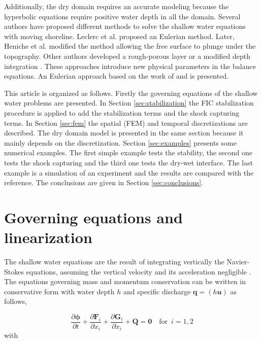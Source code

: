 \documentclass[a4paper,12pt]{elsarticle}
\newcommand{\pder}[2]{\frac{\partial#1}{\partial#2}}
\begin{document}
Additionally, the dry domain requires an accurate modeling because the hyperbolic equations require positive water depth in all the domain.
Several authors have proposed different methods to solve the shallow water equations with moving shoreline. Leclerc et al. \cite{leclerc1990} proposed an Eulerian method. Later, Heniche et al. \cite{heniche2000} modified the method allowing the free surface to plunge under the topography.
Other authors developed a rough-porous layer \cite{candy2017,barros2011} or a modified depth integration \cite{defina2000}. These approaches introduce new physical parameters in the balance equations.
An Eulerian approach based on the work of \cite{leclerc1990} and \cite{heniche2000} is presented.


This article is organized as follows. Firstly the governing equations of the shallow water problems are presented.
In Section \ref{sec:stabilization} the FIC stabilization procedure is applied to add the stabilization terms and the shock capturing terms.
In Section \ref{sec:fem} the spatial (FEM) and temporal discretizations are described.
The dry domain model is presented in the same section because it mainly depends on the discretization.
Section \ref{sec:examples} presents some numerical examples.
The first simple example tests the stability, the second one tests the shock capturing and the third one tests the dry-wet interface.
The last example is a simulation of an experiment and the results are compared with the reference.
The conclusions are given in Section \ref{sec:conclusions}.



\section{Governing equations and linearization}
\label{sec:equations}

The shallow water equations are the result of integrating vertically the Navier-Stokes equations, assuming the vertical velocity and its acceleration negligible \cite{abbot1979,zien3}.
The equations governing mass and momentum conservation can be written in conservative form with water depth $h$ and specific discharge $\mathbf{q}=(h\mathbf{u})$ as follows,

\begin{equation} \label{general_sw}
\pder{\bm{\phi}}{t} + \pder{\mathbf{F}_i}{x_i} + \pder{\mathbf{G}_i}{x_i} + \mathbf{Q} = \mathbf{0} \quad \text{for} \enspace i=1,2
\end{equation}
with
\end{document}
